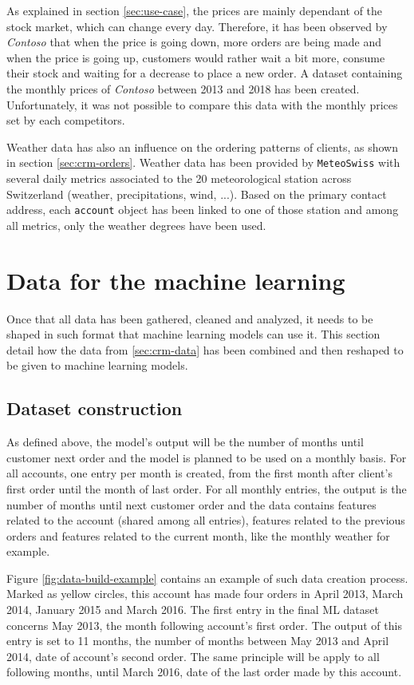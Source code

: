 As explained in section \ref{sec:use-case}, the prices are mainly dependant of the stock market, which can change every day. Therefore, it has been observed by \textit{Contoso} that when the price is going down, more orders are being made and when the price is going up, customers would rather wait a bit more, consume their stock and waiting for a decrease to place a new order. A dataset containing the monthly prices of \textit{Contoso} between 2013 and 2018 has been created. Unfortunately, it was not possible to compare this data with the monthly prices set by each competitors.

Weather data has also an influence on the ordering patterns of clients, as shown in section \ref{sec:crm-orders}. Weather data has been provided by \texttt{MeteoSwiss} with several daily metrics associated to the 20 meteorological station across Switzerland (weather, precipitations, wind, ...). Based on the primary contact address, each \texttt{account} object has been linked to one of those station and among all metrics, only the weather degrees \big[°C\big] have been used.


\section{Data for the machine learning}
Once that all data has been gathered, cleaned and analyzed, it needs to be shaped in such format that machine learning models can use it. This section detail how the data from \ref{sec:crm-data} has been combined and then reshaped to be given to machine learning models.

\subsection{Dataset construction}\label{sec:data-shape-for-ml}
As defined above, the model's output will be the number of months until customer next order and the model is planned to be used on a monthly basis. For all accounts, one entry per month is created, from the first month after client's first order until the month of last order. For all monthly entries, the output is the number of months until next customer order and the data contains features related to the account (shared among all entries), features related to the previous orders and features related to the current month, like the monthly weather for example. 

Figure \ref{fig:data-build-example} contains an example of such data creation process. Marked as yellow circles, this account has made four orders in April 2013, March 2014, January 2015 and March 2016. The first entry in the final ML dataset concerns May 2013, the month following account's first order. The output of this entry is set to 11 months, the number of months between May 2013 and April 2014, date of account's second order. The same principle will be apply to all following months, until March 2016, date of the last order made by this account.

